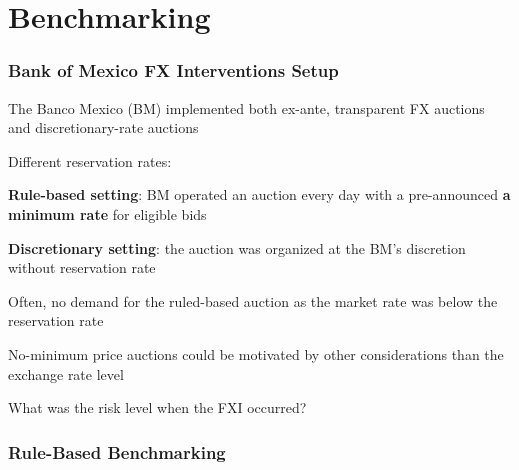 \documentclass{beamer}
\newenvironment{wideitemize}{\itemize\addtolength{\itemsep}{10pt}}{\enditemize}
\begin{document}
\section{Benchmarking}

\begin{frame}
  \frametitle{Bank of Mexico FX Interventions Setup}  
  \begin{wideitemize}
    \item The Banco Mexico (BM) implemented both ex-ante, transparent FX
      auctions and discretionary-rate auctions
    \item Different reservation rates:
      \begin{wideitemize}
      \item \textbf{Rule-based setting}: BM operated an auction every day
        with a pre-announced \textbf{a minimum rate} for eligible bids
      \item \textbf{Discretionary setting}: the auction was organized at the BM's discretion without reservation rate
      \end{wideitemize}
  \item Often, no demand for the ruled-based auction as the market rate was
    below the reservation rate
  \item No-minimum price auctions could be motivated by other considerations
    than the exchange rate level
  \item What was the risk level when the FXI occurred?
  \end{wideitemize}
\end{frame}


\begin{frame}
  \frametitle{Rule-Based Benchmarking}
\end{frame}
\end{document}
